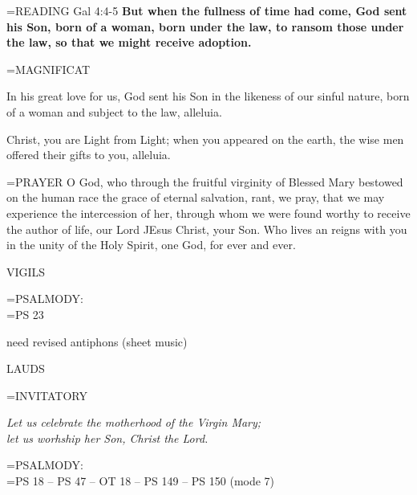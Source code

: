 \hangindent=\parindent \small{\uppercase{READING}}    Gal 4:4-5 \textbf{   But when the fullness of time had come, God sent his Son, born of a woman, born under the law, to ransom those under the law, so that we might receive adoption.\\}

\hangindent=\parindent \small MAGNIFICAT
\begin{description}[labelindent=\parindent, leftmargin=*]
\item [(before the Epiphany):]  In his great love for us, God sent his Son in the likeness of our sinful nature, born of a woman and subject to the law, alleluia.
\item [(Tuesday after the Epiphany):]  Christ, you are Light from Light; when you appeared on the earth, the wise men offered their gifts to you, alleluia.
\end{description}

\hangindent=\parindent \small{PRAYER 	O God, who through the fruitful virginity of Blessed Mary bestowed on the human race the grace of eternal salvation, rant, we pray, that we may experience the intercession of her, through whom we were found worthy to receive the author of life, our Lord JEsus Christ, your Son. Who lives an reigns with you in the unity of the Holy Spirit, one God, for ever and ever.}

\begin{flushleft}\normalsize VIGILS\\\end{flushleft}

\hangindent=\parindent \small{PSALMODY:}\\
\hangindent=\parindent  PS 23\vspace{0.5em}

need revised antiphons (sheet music)

\begin{flushleft}\normalsize LAUDS\\\end{flushleft}

\hangindent=\parindent \small{INVITATORY}
\begin{center}
\textit{Let us celebrate the motherhood of the Virgin Mary;\\}
\textit{let us worhship her Son, Christ the Lord.\\}
\end{center}

\hangindent=\parindent \small{PSALMODY:}\\
\hangindent=\parindent  PS 18 -- PS 47 -- OT 18 -- PS 149 -- PS 150 (mode 7)\vspace{0.5em}


